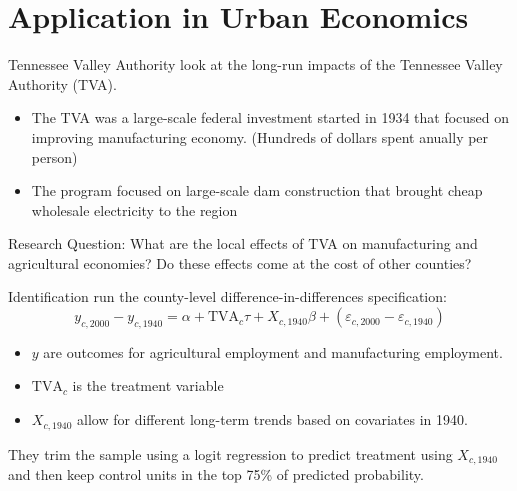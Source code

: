 \documentclass[aspectratio=169]{beamer}
\begin{document}
\section{Application in Urban Economics}

\begin{frame}{Tennessee Valley Authority}
    \citet{Kline_Moretti_2014a} look at the long-run impacts of the Tennessee Valley Authority (TVA).

    \begin{itemize}
        \item The TVA was a large-scale federal investment started in 1934 that focused on improving manufacturing economy. (Hundreds of dollars spent anually per person)
        
        \item The program focused on large-scale dam construction that brought cheap wholesale electricity to the region
    \end{itemize}

    Research Question: What are the local effects of TVA on manufacturing and agricultural economies? Do these effects come at the cost of other counties?
\end{frame}

\begin{frame}{Identification}
    \citet{Kline_Moretti_2014a} run the county-level difference-in-differences  specification: 
    \begin{equation}\label{eq:tva_spillover}
        y_{c, 2000} - y_{c, 1940} = \alpha + \text{TVA}_c \tau + X_{c, 1940} \beta + (\varepsilon_{c, 2000} - \varepsilon_{c, 1940})
    \end{equation} 

    \begin{itemize}
        \item $y$ are outcomes for agricultural employment and manufacturing employment.
        \item $\text{TVA}_c$ is the treatment variable
        \item $X_{c, 1940}$ allow for different long-term trends based on covariates in 1940. 
    \end{itemize}

    They trim the sample using a logit regression to predict treatment using $X_{c,1940}$ and then keep control units in the top 75\% of predicted probability.
\end{frame}
\end{document}
